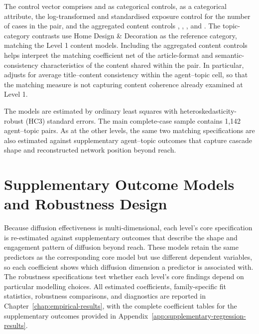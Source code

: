 The control vector comprises  and  as categorical controls,  as a categorical attribute, the log-transformed and standardised exposure control  for the number of cases in the pair, and the aggregated content controls , , , and . The topic-category contrasts use Home Design \& Decoration as the reference category, matching the Level 1 content models. Including the aggregated content controls helps interpret the matching coefficient net of the article-format and semantic-consistency characteristics of the content shared within the pair. In particular,  adjusts for average title–content consistency within the agent–topic cell, so that the matching measure is not capturing content coherence already examined at Level 1.

The models are estimated by ordinary least squares with heteroskedasticity-robust (HC3) standard errors. The main complete-case sample contains 1,142 agent–topic pairs. As at the other levels, the same two matching specifications are also estimated against supplementary agent–topic outcomes that capture cascade shape and reconstructed network position beyond reach.

\section{Supplementary Outcome Models and Robustness Design}
\label{sec:5-4-supplementary-outcome-models-and-robustness-design}

Because diffusion effectiveness is multi-dimensional, each level's core specification is re-estimated against supplementary outcomes that describe the shape and engagement pattern of diffusion beyond reach. These models retain the same predictors as the corresponding core model but use different dependent variables, so each coefficient shows which diffusion dimension a predictor is associated with. The robustness specifications test whether each level's core findings depend on particular modelling choices. All estimated coefficients, family-specific fit statistics, robustness comparisons, and diagnostics are reported in Chapter~\ref{chap:empirical-results}, with the complete coefficient tables for the supplementary outcomes provided in Appendix~\ref{app:supplementary-regression-results}.

